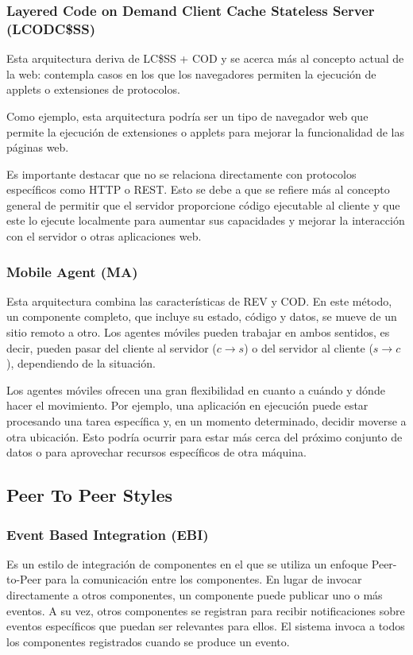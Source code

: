 \documentclass{article}
\begin{document}
		
		
		\subsubsection{Layered Code on Demand Client Cache Stateless Server (LCODC\$SS)}
		Esta arquitectura deriva de LC\$SS + COD y se acerca más al concepto actual de la web: contempla casos en los que los navegadores permiten la ejecución de applets o extensiones de protocolos.
		
		Como ejemplo, esta arquitectura podría ser un tipo de navegador web que permite la ejecución de extensiones o applets para mejorar la funcionalidad de las páginas web.
		
		Es importante destacar que no se relaciona directamente con protocolos específicos como HTTP o REST. Esto se debe a que se refiere más al concepto general de permitir que el servidor proporcione código ejecutable al cliente y que este lo ejecute localmente para aumentar sus capacidades y mejorar la interacción con el servidor o otras aplicaciones web.
		
		\subsubsection{Mobile Agent (MA)}
		Esta arquitectura combina las características de REV y COD. En este método, un componente completo, que incluye su estado, código y datos, se mueve de un sitio remoto a otro. Los agentes móviles pueden trabajar en ambos sentidos, es decir, pueden pasar del cliente al servidor ($c \to s$) o del servidor al cliente ($s \to c$), dependiendo de la situación.
		
		Los agentes móviles ofrecen una gran flexibilidad en cuanto a cuándo y dónde hacer el movimiento. Por ejemplo, una aplicación en ejecución puede estar procesando una tarea específica y, en un momento determinado, decidir moverse a otra ubicación. Esto podría ocurrir para estar más cerca del próximo conjunto de datos o para aprovechar recursos específicos de otra máquina.
		
		\subsection{Peer To Peer Styles}
			\subsubsection{Event Based Integration (EBI)}
			Es un estilo de integración de componentes en el que se utiliza un enfoque Peer-to-Peer para la comunicación entre los componentes. En lugar de invocar directamente a otros componentes, un componente puede publicar uno o más eventos. A su vez, otros componentes se registran para recibir notificaciones sobre eventos específicos que puedan ser relevantes para ellos. El sistema invoca a todos los componentes registrados cuando se produce un evento.
			
\end{document}
